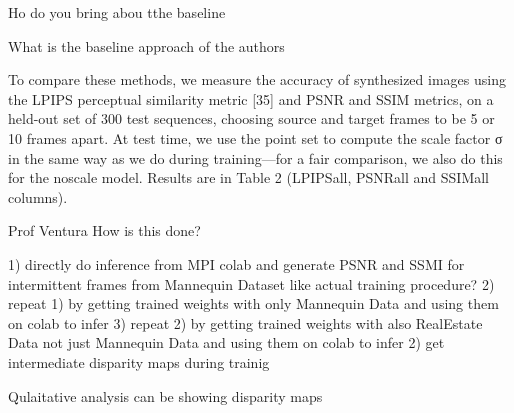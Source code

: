 Ho do you bring abou tthe baseline 

What is the baseline approach of the authors 

To compare these methods, we measure the accuracy of
synthesized images using the LPIPS perceptual similarity
metric [35] and PSNR and SSIM metrics, on a held-out set
of 300 test sequences, choosing source and target frames
to be 5 or 10 frames apart. At test time, we use the point
set to compute the scale factor σ in the same way as we do
during training—for a fair comparison, we also do this for
the noscale model. Results are in Table 2 (LPIPSall, PSNRall
and SSIMall columns).

Prof Ventura How is this done?


1) directly do inference from MPI colab and generate PSNR and SSMI for intermittent frames from Mannequin Dataset like actual training procedure?
2) repeat 1) by getting trained weights with only Mannequin Data and using them on colab to infer  
3) repeat 2) by getting trained weights with also RealEstate Data not just Mannequin Data and using them on colab to infer
2) get intermediate disparity maps during trainig 

Qulaitative analysis can be showing disparity maps 
